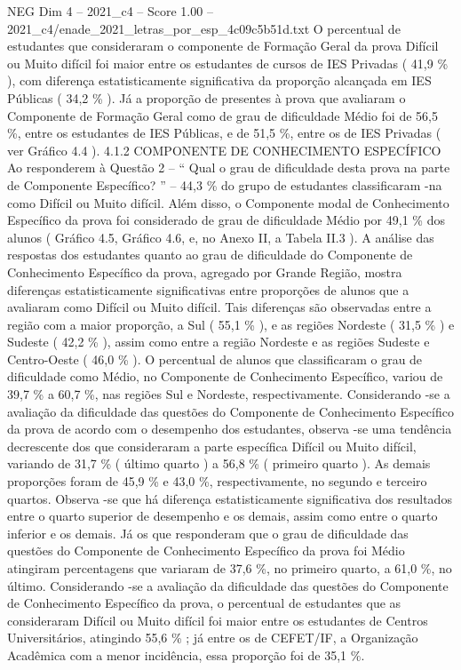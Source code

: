 \begin{textsample}{NEG Dim 4 – 2021\_c4 – Score 1.00 – 2021\_c4/enade\_2021\_letras\_por\_esp\_4c09c5b51d.txt}
O percentual de estudantes que consideraram o componente de Formação Geral da prova Difícil ou Muito difícil foi maior entre os estudantes de cursos de IES Privadas ( 41,9 \% ), com diferença estatisticamente significativa da proporção alcançada em IES Públicas ( 34,2 \% ).
Já a proporção de presentes à prova que avaliaram o Componente de Formação Geral como de grau de dificuldade Médio foi de 56,5 \%, entre os estudantes de IES Públicas, e de 51,5 \%, entre os de IES Privadas ( ver Gráfico 4.4 ). 4.1.2 COMPONENTE DE CONHECIMENTO ESPECÍFICO Ao responderem à Questão 2 – “ Qual o grau de dificuldade desta prova na parte de Componente Específico? ” – 44,3 \% do grupo de estudantes classificaram -na como Difícil ou Muito difícil.
Além disso, o Componente modal de Conhecimento Específico da prova foi considerado de grau de dificuldade Médio por 49,1 \% dos alunos ( Gráfico 4.5, Gráfico 4.6, e, no Anexo II, a Tabela II.3 ).
A análise das respostas dos estudantes quanto ao grau de dificuldade do Componente de Conhecimento Específico da prova, agregado por Grande Região, mostra diferenças estatisticamente significativas entre proporções de alunos que a avaliaram como Difícil ou Muito difícil.
Tais diferenças são observadas entre a região com a maior proporção, a Sul ( 55,1 \% ), e as regiões Nordeste ( 31,5 \% ) e Sudeste ( 42,2 \% ), assim como entre a região Nordeste e as regiões Sudeste e Centro-Oeste ( 46,0 \% ).
O percentual de alunos que classificaram o grau de dificuldade como Médio, no Componente de Conhecimento Específico, variou de 39,7 \% a 60,7 \%, nas regiões Sul e Nordeste, respectivamente.
Considerando -se a avaliação da dificuldade das questões do Componente de Conhecimento Específico da prova de acordo com o desempenho dos estudantes, observa -se uma tendência decrescente dos que consideraram a parte específica Difícil ou Muito difícil, variando de 31,7 \% ( último quarto ) a 56,8 \% ( primeiro quarto ).
As demais proporções foram de 45,9 \% e 43,0 \%, respectivamente, no segundo e terceiro quartos.
Observa -se que há diferença estatisticamente significativa dos resultados entre o quarto superior de desempenho e os demais, assim como entre o quarto inferior e os demais.
Já os que responderam que o grau de dificuldade das questões do Componente de Conhecimento Específico da prova foi Médio atingiram percentagens que variaram de 37,6 \%, no primeiro quarto, a 61,0 \%, no último.
Considerando -se a avaliação da dificuldade das questões do Componente de Conhecimento Específico da prova, o percentual de estudantes que as consideraram Difícil ou Muito difícil foi maior entre os estudantes de Centros Universitários, atingindo 55,6 \% ; já entre os de CEFET/IF, a Organização Acadêmica com a menor incidência, essa proporção foi de 35,1 \%.

\end{textsample}
